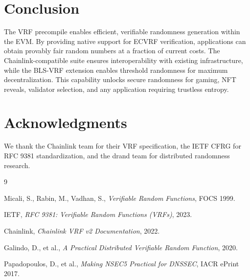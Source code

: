 \documentclass[11pt,a4paper]{article}
\theoremstyle{definition}
\begin{document}
\section{Conclusion}

The VRF precompile enables efficient, verifiable randomness generation within the EVM. By providing native support for ECVRF verification, applications can obtain provably fair random numbers at a fraction of current costs. The Chainlink-compatible suite ensures interoperability with existing infrastructure, while the BLS-VRF extension enables threshold randomness for maximum decentralization. This capability unlocks secure randomness for gaming, NFT reveals, validator selection, and any application requiring trustless entropy.

\section*{Acknowledgments}

We thank the Chainlink team for their VRF specification, the IETF CFRG for RFC 9381 standardization, and the drand team for distributed randomness research.


\begin{thebibliography}{9}

Micali, S., Rabin, M., Vadhan, S.,
\textit{Verifiable Random Functions},
FOCS 1999.

IETF,
\textit{RFC 9381: Verifiable Random Functions (VRFs)},
2023.

Chainlink,
\textit{Chainlink VRF v2 Documentation},
2022.

Galindo, D., et al.,
\textit{A Practical Distributed Verifiable Random Function},
2020.

Papadopoulos, D., et al.,
\textit{Making NSEC5 Practical for DNSSEC},
IACR ePrint 2017.

\end{thebibliography}
\end{document}

